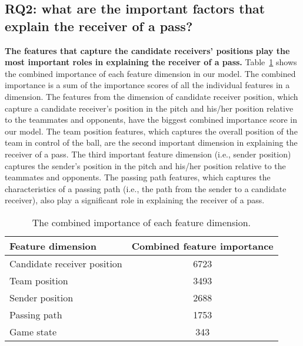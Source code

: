 \subsection{RQ2: what are the important factors that explain the receiver of a pass?}\label{RQ3-results}

\textbf{The features that capture the candidate receivers' positions play the most important roles in explaining the receiver of a pass.}
Table~\ref{tab:combined-feature-importance} shows the combined importance of each feature dimension in our model. The combined importance is a sum of the importance scores of all the individual features in a dimension.
The features from the dimension of candidate receiver position, which capture a candidate receiver's position in the pitch and his/her position relative to the teammates and opponents, have the biggest combined importance score in our model.
The team position features, which captures the overall position of the team in control of the ball, are the second important dimension in explaining the receiver of a pass.
The third important feature dimension (i.e., sender position) captures the sender's position in the pitch and his/her position relative to the teammates and opponents.
The passing path features, which captures the characteristics of a passing path (i.e., the path from the sender to a candidate receiver), also play a significant role in explaining the receiver of a pass.

\begin{table}[!t]
\caption{The combined importance of each feature dimension.}
\centering
\renewcommand{\tabcolsep}{3pt}
\begin{tabular}{lc}
  \toprule
  Feature dimension & Combined feature importance \\
  \midrule
  Candidate receiver position & 6723 \\
  Team position & 3493 \\
  Sender position & 2688 \\
  Passing path & 1753 \\
  Game state & 343 \\
  \bottomrule
\end{tabular}
\label{tab:combined-feature-importance}
\end{table}

